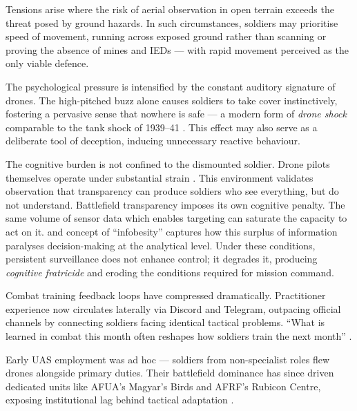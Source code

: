 Tensions arise where the risk of aerial observation in open terrain exceeds the threat posed by ground hazards. In such circumstances, soldiers may prioritise speed of movement, running across exposed ground rather than scanning or proving the absence of mines and IEDs --- with rapid movement perceived as the only viable defence.

The psychological pressure is intensified by the constant auditory signature of drones. The high-pitched buzz alone causes soldiers to take cover instinctively, fostering a pervasive sense that nowhere is safe --- a modern form of \textit{drone shock} comparable to the tank shock of 1939--41 \parencite{MOLLOY_2024,neron_bancel_2024_05_27}. This effect may also serve as a deliberate tool of deception, inducing unnecessary reactive behaviour.

The cognitive burden is not confined to the dismounted soldier. Drone pilots themselves operate under substantial strain \parencite[3:20--5:37]{civdiv_1}. This environment validates  observation that transparency can produce soldiers who see everything, but do not understand. Battlefield transparency imposes its own cognitive penalty. The same volume of sensor data which enables targeting can saturate the capacity to act on it. \textcite{perez} and  concept of ``infobesity'' captures how this surplus of information paralyses decision-making at the analytical level. Under these conditions, persistent surveillance does not enhance control; it degrades it, producing \textit{cognitive fratricide} and eroding the conditions required for mission command.



Combat training feedback loops have compressed dramatically. Practitioner experience now circulates laterally via Discord and Telegram, outpacing official channels by connecting soldiers facing identical tactical problems. ``What is learned in combat this month often reshapes how soldiers train the next month'' \parencite{TCAG_Brad}.

Early UAS employment was ad hoc --- soldiers from non-specialist roles flew drones alongside primary duties. Their battlefield dominance has since driven dedicated units like AFUA's Magyar's Birds and AFRF's Rubicon Centre, exposing institutional lag behind tactical adaptation \parencite{MOLLOY_2024}.

